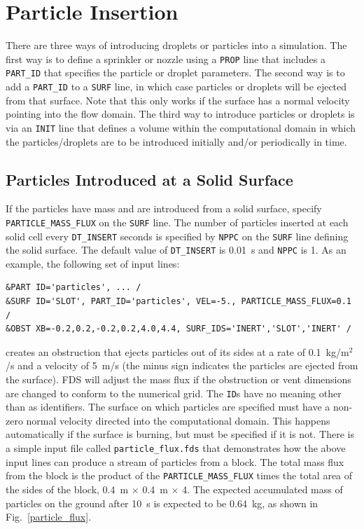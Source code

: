 \documentclass[11pt]{book}
\newcommand{\ct}{\tt\small}
\begin{document}
\clearpage

\section{Particle Insertion}
\label{info:controlling_droplets}

There are three ways of introducing droplets or particles into a simulation. The first way is to define a sprinkler or
nozzle using a {\ct PROP} line that includes a {\ct PART\_ID} that specifies the particle or droplet parameters. The second way is to
add a {\ct PART\_ID} to a {\ct SURF} line, in which case particles or droplets will be ejected from that surface. Note that
this only works if the surface has a normal velocity pointing into the flow domain. The third way to introduce particles or
droplets is via an {\ct INIT} line that defines a volume within the computational domain in which the particles/droplets are
to be introduced initially and/or periodically in time.


\subsection{Particles Introduced at a Solid Surface}
\label{info:particle_flux}

If the particles have mass and are introduced from a solid surface, specify {\ct PARTICLE\_MASS\_FLUX} on the {\ct SURF} line.
The number of particles inserted at each solid cell every
{\ct DT\_INSERT} seconds is specified by {\ct NPPC} on the {\ct SURF} line defining the solid surface. The default
value of {\ct DT\_INSERT} is 0.01~s and {\ct NPPC} is 1. As an example, the following set of input lines:

\footnotesize
\begin{verbatim}
&PART ID='particles', ... /
&SURF ID='SLOT', PART_ID='particles', VEL=-5., PARTICLE_MASS_FLUX=0.1 /
&OBST XB=-0.2,0.2,-0.2,0.2,4.0,4.4, SURF_IDS='INERT','SLOT','INERT' /
\end{verbatim} \normalsize

\noindent
creates an obstruction that ejects particles out of its sides at a rate
of 0.1~kg/m$^2$/s and a velocity of 5~m/s (the minus sign indicates the particles are ejected from the surface).
FDS will adjust the mass flux if the obstruction or vent dimensions are changed to conform to the numerical grid. The
{\ct ID}s have no meaning other than as identifiers. The surface on which particles are specified must have a non-zero normal velocity directed into the
computational domain. This happens automatically if the surface is burning, but must be specified
if it is not. There is a simple input file called {\ct particle\_flux.fds} that demonstrates how the above input lines can produce a stream of
particles from a block. The total mass flux from the block is the product of the {\ct PARTICLE\_MASS\_FLUX} times the total area of the sides of the block,
0.4~m $\times$ 0.4~m $\times$ 4. The expected accumulated mass of particles on the ground after 10~s is expected to be 0.64~kg, as shown in Fig.~\ref{particle_flux}.
\end{document}
